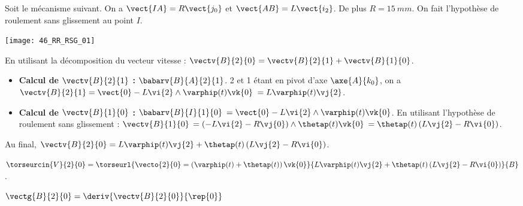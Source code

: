 \normalfalse \difficiletrue \tdifficilefalse
\correctiontrue


\setcounter{question}{0}%
\ifcorrection
\else
{}
\fi

\ifprof
\else
Soit le mécanisme suivant. On a $\vect{IA}=R\vect{j_0}$ et $\vect{AB}=L\vect{i_2}$. De plus $R=\SI{15}{mm}$. On fait l'hypothèse de roulement sans glissement au point $I$.
\begin{marginfigure}
\texttt{[image: 46\_RR\_RSG\_01]}
\end{marginfigure}
\fi


\ifprof
En utilisant la décomposition du vecteur vitesse : 
$\vectv{B}{2}{0} = \vectv{B}{2}{1} +  \vectv{B}{1}{0}$.

\begin{itemize}
\item \textbf{Calcul de $ \vectv{B}{2}{1}$ :}  $\babarv{B}{A}{2}{1}$. 2 et 1 étant en pivot d'axe $\axe{A}{k_0}$, on a $\vectv{B}{2}{1}=\vect{0}-L\vi{2}\wedge \varphip(t)\vk{0}$
$=L\varphip(t)\vj{2}$.
\item \textbf{Calcul de $ \vectv{B}{1}{0}$ :}  $\babarv{B}{I}{1}{0}$ 
$=\vect{0}-L\vi{2}\wedge \varphip(t)\vk{0}$. En utilisant l'hypothèse de roulement sans glissement : $ \vectv{B}{1}{0}$  $=\left(-L\vi{2}-R\vj{0}\right)\wedge \thetap(t)\vk{0}$  $=\thetap(t)\left(L\vj{2}-R\vi{0}\right)$.
\end{itemize}

Au final, $\vectv{B}{2}{0} = L\varphip(t)\vj{2} +\thetap(t)\left(L\vj{2}-R\vi{0}\right) $.


\else
\fi

\ifprof
 $\torseurcin{V}{2}{0} = \torseurl{\vecto{2}{0}=\left( \varphip(t)+\thetap(t) \right) \vk{0} }{ L\varphip(t)\vj{2} +\thetap(t)\left(L\vj{2}-R\vi{0}\right)}{B}$.
 

\else
\fi


\ifprof
$\vectg{B}{2}{0} = \deriv{\vectv{B}{2}{0}}{\rep{0}}$

